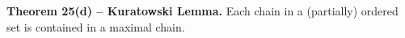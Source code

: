 \textbf{Theorem 25(d) -- Kuratowski Lemma.} Each chain in a (partially) ordered set is contained in a maximal chain.
